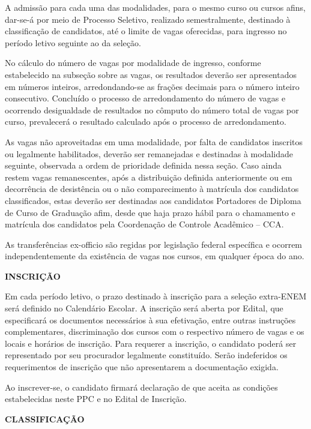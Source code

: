 	A admissão para cada uma das modalidades, para o mesmo curso ou cursos afins, dar-se-á por meio de Processo Seletivo, realizado semestralmente, destinado à classificação de candidatos, até o limite de vagas oferecidas, para ingresso no período letivo seguinte ao da seleção.

	No cálculo do número de vagas por modalidade de ingresso, conforme estabelecido na subseção sobre as vagas, os resultados deverão ser apresentados em números inteiros, arredondando-se as frações decimais para o número inteiro consecutivo. Concluído o processo de arredondamento do número de vagas e ocorrendo desigualdade de resultados no cômputo do número total de vagas por curso, prevalecerá o resultado calculado após o processo de arredondamento.

	As vagas não aproveitadas em uma modalidade, por falta de candidatos inscritos ou legalmente habilitados, deverão ser remanejadas e destinadas à modalidade seguinte, observada a ordem de prioridade definida nessa seção. Caso ainda restem vagas remanescentes, após a distribuição definida anteriormente ou em decorrência de desistência ou o não comparecimento à matrícula dos candidatos classificados, estas deverão ser destinadas aos candidatos Portadores de Diploma de Curso de Graduação afim, desde que haja prazo hábil para o chamamento e matrícula dos candidatos pela Coordenação de Controle Acadêmico – CCA.

	As transferências ex-officio são regidas por legislação federal específica e ocorrem independentemente da existência de vagas nos cursos, em qualquer época do ano.

\vspace{4mm}
\textbf{INSCRIÇÃO}
\vspace{4mm}

	Em cada período letivo, o prazo destinado à inscrição para a seleção extra-ENEM será definido no Calendário Escolar. A inscrição será aberta por Edital, que especificará os documentos necessários à sua efetivação, entre outras instruções complementares, discriminação dos cursos com o respectivo número de vagas e os locais e horários de inscrição. Para requerer a inscrição, o candidato poderá ser representado por seu procurador legalmente constituído. Serão indeferidos os requerimentos de inscrição que não apresentarem a documentação exigida.

	Ao inscrever-se, o candidato firmará declaração de que aceita as condições estabelecidas neste PPC e no Edital de Inscrição.

\vspace{4mm}
\textbf{CLASSIFICAÇÃO}\
\vspace{4mm}

